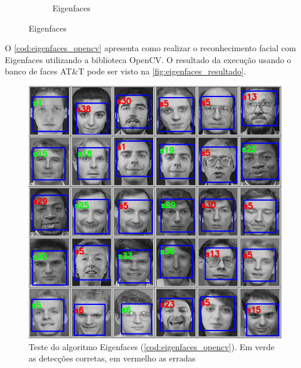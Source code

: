 \begin{figure}[htbp]
\begin{subfigure}[t]{0.3\textwidth}
    \caption{Eigenfaces}
    \end{subfigure}
\end{figure}

O \autoref{cod:eigenfaces_opencv} apresenta como realizar o reconhecimento facial com Eigenfaces utilizando a biblioteca OpenCV. O resultado da execução usando o banco de faces AT\&T pode ser visto na \autoref{fig:eigenfaces_resultado}.

\begin{figure}[htbp]
    \centering
    \caption[Teste do algoritmo Eigenfaces]{Teste do algoritmo Eigenfaces (\autoref{cod:eigenfaces_opencv}). Em verde as detecções corretas, em vermelho as erradas}
    \label{fig:eigenfaces_resultado}
    \includegraphics[width=0.95\linewidth]{imagens/eigenfaces_resultado.jpg}
\end{figure}

